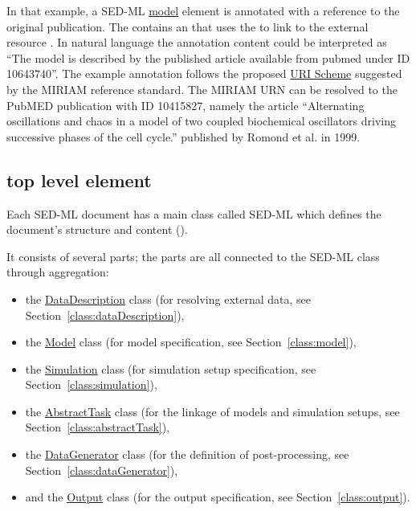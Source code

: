 In that example, a SED-ML \hyperref[class:model]{model} element is annotated with a reference to the original publication. The  contains an  that uses the   to link to the external resource . In natural language the annotation content could be interpreted as ``The model is described by the published article available from pubmed under ID 10643740''. The example annotation follows the proposed \hyperref[sec:uriScheme]{URI Scheme} suggested by the MIRIAM reference standard. The MIRIAM URN can be resolved to the PubMED publication with ID 10415827, namely the article ``Alternating oscillations and chaos in a model of two coupled biochemical oscillators driving successive phases of the cell cycle.'' published by Romond et al. in  1999.


\subsection{ top level element}
\label{class:sed-ml}
Each SED-ML \currentLV document has a main class called SED-ML which defines the document's structure and content ().

It consists of several parts; the parts are all connected to the SED-ML class through aggregation: 
\begin{itemize}
	\item the \hyperref[class:dataDescription]{DataDescription} class (for resolving external data, see Section~\ref{class:dataDescription}), 
	\item the \hyperref[class:model]{Model} class (for model specification, see Section~\ref{class:model}), 
	\item the \hyperref[class:simulation]{Simulation} class (for simulation setup specification, see Section~\ref{class:simulation}), 
	\item the \hyperref[class:abstractTask]{AbstractTask} class (for the linkage of models and simulation setups, see Section~\ref{class:abstractTask}), 
	\item the \hyperref[class:dataGenerator]{DataGenerator} class (for the definition of post-processing, see Section~\ref{class:dataGenerator}),
	\item and the \hyperref[class:output]{Output} class (for the output specification, see Section~\ref{class:output}).
\end{itemize}

